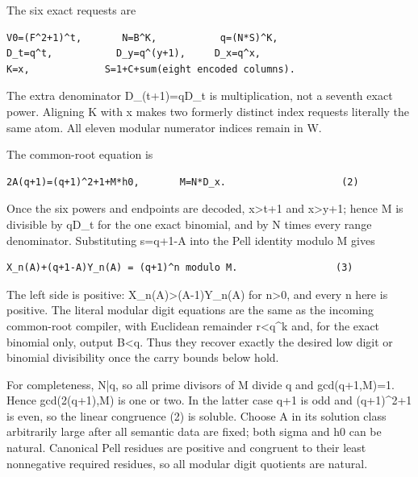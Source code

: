 The six exact requests are



\begin{verbatim}
V0=(F^2+1)^t,       N=B^K,           q=(N*S)^K,
D_t=q^t,           D_y=q^(y+1),     D_x=q^x,
K=x,             S=1+C+sum(eight encoded columns).
\end{verbatim}

The extra denominator D\_\allowbreak{}(t+\allowbreak{}1)=\allowbreak{}q\textasteriskcentered{}\allowbreak{}D\_\allowbreak{}t is multiplication, not a seventh exact power. Aligning K with x makes two formerly distinct index requests literally the same atom. All eleven modular numerator indices remain in W.



The common-root equation is



\begin{verbatim}
2A(q+1)=(q+1)^2+1+M*h0,       M=N*D_x.                    (2)
\end{verbatim}

Once the six powers and endpoints are decoded, x\textgreater{}\allowbreak{}t+\allowbreak{}1 and x\textgreater{}\allowbreak{}y+\allowbreak{}1; hence M is divisible by qD\_\allowbreak{}t for the one exact binomial, and by N times every range denominator. Substituting s=\allowbreak{}q+\allowbreak{}1-A into the Pell identity modulo M gives



\begin{verbatim}
X_n(A)+(q+1-A)Y_n(A) = (q+1)^n modulo M.                 (3)
\end{verbatim}

The left side is positive: X\_\allowbreak{}n(A)\textgreater{}\allowbreak{}(A-1)Y\_\allowbreak{}n(A) for n\textgreater{}\allowbreak{}0, and every n here is positive. The literal modular digit equations are the same as the incoming common-root compiler, with Euclidean remainder r\textless{}\allowbreak{}q\textasciicircum{}\allowbreak{}k and, for the exact binomial only, output B\textless{}\allowbreak{}q. Thus they recover exactly the desired low digit or binomial divisibility once the carry bounds below hold.



For completeness, N|q, so all prime divisors of M divide q and gcd(q+\allowbreak{}1,M)=\allowbreak{}1. Hence gcd(2(q+\allowbreak{}1),M) is one or two. In the latter case q+\allowbreak{}1 is odd and (q+\allowbreak{}1)\textasciicircum{}\allowbreak{}2+\allowbreak{}1 is even, so the linear congruence (2) is soluble. Choose A in its solution class arbitrarily large after all semantic data are fixed; both sigma and h0 can be natural. Canonical Pell residues are positive and congruent to their least nonnegative required residues, so all modular digit quotients are natural.



